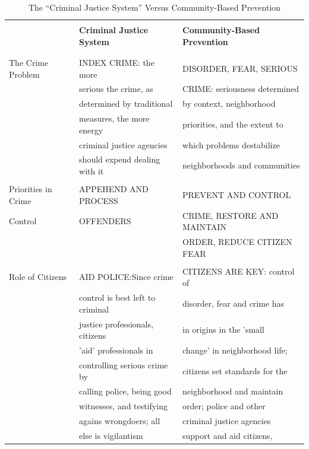 \documentclass[
	12pt,				%
	openright,			%
	twoside,			%
	a4paper,			%
	chapter=TITLE,		%
	section=TITLE,		%
	subsection=TITLE,	%
	subsubsection=TITLE,%
	spanish,            %
	english,			%
	brazil				%
	]{abntex2}
\begin{document}
\begin{table}[!htpb]
	\begin{tiny}
		\caption{The “Criminal Justice System” Versus Community-Based Prevention}%
		\label{Tabela 8}
		\begin{center}
		\begin{tabular}{lll}
			\hline\\
			      & \textbf{Criminal Justice System} & \textbf{Community-Based Prevention} \\\\
			\hline
			\hline\\
			The Crime Problem & INDEX CRIME: the more & DISORDER, FEAR, SERIOUS\\
							  & serious the crime, as & CRIME: seriousness determined\\
							  & determined by traditional & by context, neighborhood\\ 
							  & measures, the more energy & priorities, and the extent to\\  
							  & criminal justice agencies & which problems destabilize\\ 
							  & should expend dealing with it & neighborhoods and communities \\\\
			Priorities in Crime& APPEHEND AND PROCESS & PREVENT AND CONTROL \\
			Control & OFFENDERS & CRIME, RESTORE AND MAINTAIN\\
					&			& ORDER, REDUCE CITIZEN FEAR \\\\
			Role of Citizens & AID POLICE:Since crime  & CITIZENS ARE KEY: control of  \\
							& control is best left to criminal & disorder, fear and crime has \\
							& justice professionals, citizens & in origins in the 'small \\
							& 'aid' professionals in & change' in neighborhood life; \\
							& controlling serious crime by & citizens set standards for the \\
							& calling police, being good & neighborhood and maintain \\
							& witnesses, and testifying & order; police and other \\
							& agains wrongdoers; all & criminal justice agencies \\
							&  else is vigilantism & support and aid citizens, \\

\end{tabular}
\end{center}
\end{tiny}
\end{table}
\end{document}
